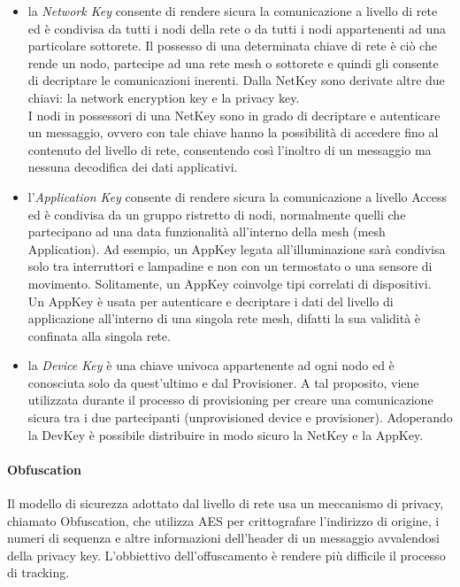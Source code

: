 \begin{itemize}
    \item la \textit{Network Key} consente di rendere sicura la comunicazione a livello di rete ed è condivisa da tutti i nodi della rete o da tutti i nodi appartenenti ad una particolare sottorete. Il possesso di una determinata chiave di rete è ciò che rende un nodo, partecipe ad una rete mesh o sottorete e quindi gli consente di decriptare le comunicazioni inerenti. Dalla NetKey sono derivate altre due chiavi: la network encryption key e la privacy key. \\
    I nodi in possessori di una NetKey sono in grado di decriptare e autenticare un messaggio, ovvero con tale chiave hanno la possibilità di accedere fino al contenuto del livello di rete, consentendo così l'inoltro di un messaggio ma nessuna decodifica dei dati applicativi.

    \item l'\textit{Application Key} consente di rendere sicura la comunicazione a livello Access ed è condivisa da un gruppo ristretto di nodi, normalmente quelli che partecipano ad una data funzionalità all'interno della mesh (mesh Application). Ad esempio, un AppKey legata all'illuminazione sarà condivisa solo tra interruttori e lampadine e non con un termostato o una sensore di movimento. Solitamente, un AppKey coinvolge tipi correlati di dispositivi. \\ 
    Un AppKey è usata per autenticare e decriptare i dati del livello di applicazione all'interno di una singola rete mesh, difatti la sua validità è confinata alla singola rete.
    
    \item la \textit{Device Key} è una chiave univoca appartenente ad ogni nodo ed è conosciuta solo da quest'ultimo e dal Provisioner. A tal proposito, viene utilizzata durante il processo di provisioning per creare una comunicazione sicura tra i due partecipanti (unprovisioned device e provisioner). Adoperando la DevKey è possibile distribuire in modo sicuro la NetKey e la AppKey.

\end{itemize}

\paragraph{Obfuscation}
Il modello di sicurezza adottato dal livello di rete usa un meccanismo di privacy, chiamato Obfuscation, che utilizza AES per crittografare l'indirizzo di origine, i numeri di sequenza e altre informazioni dell'header di un messaggio avvalendosi della privacy key. L'obbiettivo dell'offuscamento è rendere più difficile il processo di tracking.

